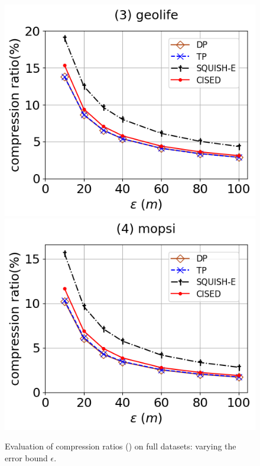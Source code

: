 \begin{figure}[tb!]
	\includegraphics[scale=0.315]{Figures/Exp-SED-CR-epsilon-geolife.png}	\hspace{1ex}
	\includegraphics[scale=0.315]{Figures/Exp-SED-CR-epsilon-mopsi.png}		
	\vspace{-3ex}
	\caption{\small Evaluation of compression ratios (\sed) on full datasets: varying the error bound $\epsilon$.}
	\label{fig:cr-sed-epsilon}
	\vspace{-2ex}
\end{figure}


